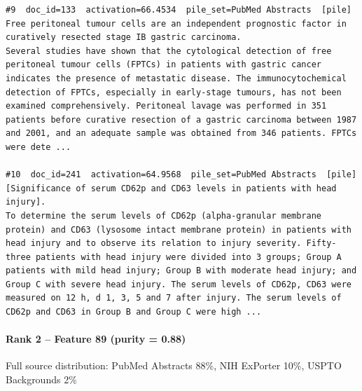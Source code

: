 \begin{verbatim}
#9  doc_id=133  activation=66.4534  pile_set=PubMed Abstracts  [pile]
Free peritoneal tumour cells are an independent prognostic factor in curatively resected stage IB gastric carcinoma.
Several studies have shown that the cytological detection of free peritoneal tumour cells (FPTCs) in patients with gastric cancer indicates the presence of metastatic disease. The immunocytochemical detection of FPTCs, especially in early-stage tumours, has not been examined comprehensively. Peritoneal lavage was performed in 351 patients before curative resection of a gastric carcinoma between 1987 and 2001, and an adequate sample was obtained from 346 patients. FPTCs were dete ...

#10  doc_id=241  activation=64.9568  pile_set=PubMed Abstracts  [pile]
[Significance of serum CD62p and CD63 levels in patients with head injury].
To determine the serum levels of CD62p (alpha-granular membrane protein) and CD63 (lysosome intact membrane protein) in patients with head injury and to observe its relation to injury severity. Fifty-three patients with head injury were divided into 3 groups; Group A patients with mild head injury; Group B with moderate head injury; and Group C with severe head injury. The serum levels of CD62p, CD63 were measured on 12 h, d 1, 3, 5 and 7 after injury. The serum levels of CD62p and CD63 in Group B and Group C were high ...

\end{verbatim}

\paragraph*{Rank 2 -- Feature 89 (purity = 0.88)}

Full source distribution: PubMed Abstracts 88\%, NIH ExPorter 10\%, USPTO Backgrounds 2\%

